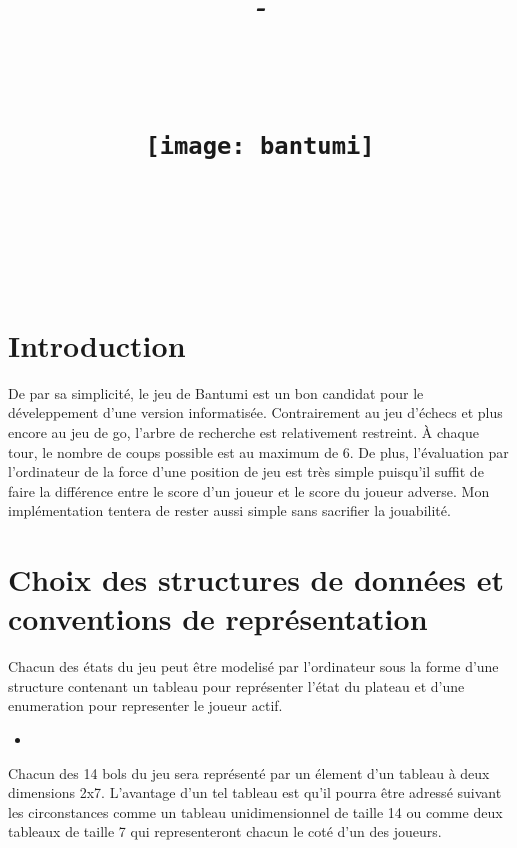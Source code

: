 \documentclass{article}
\title{
\vspace{0.2in}\large\textsc{\hmwkLaboratory}\\
\vspace{0.8in}
\huge{\textbf{\hmwkClass}}\\
\vspace{0.1in}\textit{-}\\
\vspace{0.1in}\Huge{\textit{\hmwkProject}}\\
\vspace{0.5in}\Large{\textbf{\hmwkPhase}}\\
\vspace{0.4in}
\begin{center}
\texttt{[image: bantumi]} %
\end{center}
\vspace{0.8in}\LARGE{\hmwkAuthorName}\\
\Large\vspace{1in}{\hmwkYear}\\
\vspace{0.3in}
}
\author{}
\date{}
\newcommand{\cscript}[2]{
\begin{itemize}
\item[]
\end{itemize}
}
\begin{document}
\maketitle
\newpage
\tableofcontents
\newpage


\section{Introduction}

De par sa simplicit\'e, le jeu de Bantumi est un bon candidat pour le d\'eveleppement d'une version informatis\'ee. Contrairement au jeu d'\'echecs et plus encore au jeu de go, l'arbre de recherche est relativement restreint. \`A chaque tour, le nombre de coups possible est au maximum de 6. De plus, l'\'evaluation par l'ordinateur de la force d'une position de jeu est tr\`es simple puisqu'il suffit de faire la diff\'erence entre le score d'un joueur et le score du joueur adverse. Mon impl\'ementation tentera de rester aussi simple sans sacrifier la jouabilit\'e.

\section{Choix des structures de donn\'{e}es et conventions de repr\'esentation}

Chacun des \'etats du jeu peut \^etre modelis\'e par l'ordinateur sous la forme d'une structure contenant un tableau  pour repr\'esenter l'\'etat du plateau et d'une enumeration pour representer le joueur actif.

\cscript{struct}{Structure repr\'esentant l'\'etat du jeu}

Chacun des 14 bols du jeu sera repr\'esent\'e par un \'element d'un tableau \`a deux dimensions 2x7. L'avantage d'un tel tableau est qu'il pourra \^etre adress\'e suivant les circonstances comme un tableau unidimensionnel de taille 14 ou comme deux tableaux de taille 7 qui representeront chacun le cot\'e d'un des joueurs. 
\end{document}
